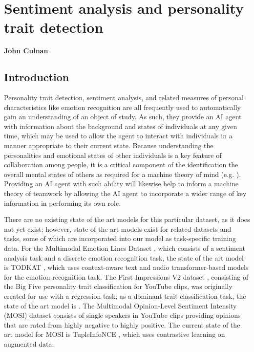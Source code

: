 \chapter{Sentiment analysis and personality trait detection}
\label{ch:sentiment_analysis}
\textbf{John Culnan}
\section{Introduction}

Personality trait detection, sentiment analysis, and related measures of
personal characteristics like emotion recognition are all frequently used to
automatically gain an understanding of an object of study. As such, they
provide an AI agent with information about the background and states of
individuals at any given time, which may be used to allow the agent to interact
with individuals in a manner appropriate to their current state. Because
understanding the personalities and emotional states of other individuals is a
key feature of collaboration among people, it is a critical component of the
identification the overall mental states of others as required for a machine
theory of mind (e.g. \citet{Rabinowitz.ea:2018}). Providing an AI agent with
such ability will likewise help to inform a machine theory of teamwork by
allowing the AI agent to incorporate a wider range of key information in
performing its own role. 

There are no existing state of the art models for this particular dataset, as
it does not yet exist; however, state of the art models exist for related
datasets and tasks, some of which are incorporated into our model as
task-specific training data. For the Multimodal Emotion Lines Dataset
\citep{Poria.ea:2019}, which consists of a sentiment analysis task and a discrete
emotion recognition task, the state of the art model is TODKAT
\citep{Zhu.ea:2021}, which uses context-aware text and audio
transformer-based models for the emotion recognition task. The First
Impressions V2 dataset \citep{Ponce-Lopez.ea:2016}, consisting of the Big Five
personality trait classification for YouTube clips, was originally created for
use with a regression task; as a dominant trait classification task, the state
of the art model is \citet{Culnan.ea:2021}. The Multimodal Opinion-Level
Sentiment Intensity (MOSI) dataset \citep{Zadeh.ea:2016} consists of single
speakers in YouTube clips providing opinions that are rated from highly
negative to highly positive. The current state of the art model for MOSI is
TupleInfoNCE \citep{Liu.ea:2021}, which uses contrastive learning on
augmented data. 

